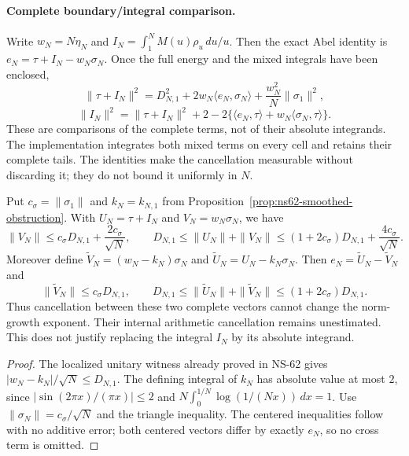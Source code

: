 \paragraph{Complete boundary/integral comparison.}
Write $w_N=N\eta_N$ and
$I_N=\int_1^N M(u)\rho_u\,du/u$.
Then the exact Abel identity is $e_N=\tau+I_N-w_N\sigma_N$.
Once the full energy and the mixed integrals have been enclosed,
\[
 \|\tau+I_N\|^2=D_{N,1}^2+2w_N\langle e_N,\sigma_N\rangle
                          +\frac{w_N^2}{N}\|\sigma_1\|^2,
\]
\[
 \|I_N\|^2=\|\tau+I_N\|^2+2
       -2\{\langle e_N,\tau\rangle+w_N\langle\sigma_N,\tau\rangle\}.
\]
These are comparisons of the complete terms, not of their absolute
integrands. The implementation integrates both mixed terms on every
cell and retains their complete tails. The identities make the
cancellation measurable without discarding it; they do not bound it
uniformly in $N$.

\begin{proposition}
\label{prop:ns67-abel-conditioning}
Put $c_\sigma=\|\sigma_1\|$ and $k_N=k_{N,1}$ from
Proposition~\ref{prop:ns62-smoothed-obstruction}. With
$U_N=\tau+I_N$ and $V_N=w_N\sigma_N$, we have
\begin{equation}
 \|V_N\|\leq c_\sigma D_{N,1}+\frac{2c_\sigma}{\sqrt N},\qquad
 D_{N,1}\leq\|U_N\|+\|V_N\|
 \leq(1+2c_\sigma)D_{N,1}+\frac{4c_\sigma}{\sqrt N}.
 \label{eq:ns67-conditioning}
\end{equation}
Moreover define $\widetilde V_N=(w_N-k_N)\sigma_N$ and
$\widetilde U_N=U_N-k_N\sigma_N$. Then
$e_N=\widetilde U_N-\widetilde V_N$ and
\begin{equation}
 \|\widetilde V_N\|\leq c_\sigma D_{N,1},\qquad
 D_{N,1}\leq\|\widetilde U_N\|+\|\widetilde V_N\|
                \leq(1+2c_\sigma)D_{N,1}.
 \label{eq:ns67-centered-conditioning}
\end{equation}
Thus cancellation between these two complete vectors cannot change the
norm-growth exponent. Their internal arithmetic cancellation remains
unestimated. This does not justify replacing the integral $I_N$ by
its absolute integrand.
\end{proposition}
\begin{proof}
The localized unitary witness already proved in NS-62 gives
$|w_N-k_N|/\sqrt N\leq D_{N,1}$.
The defining integral of $k_N$ has absolute value at most $2$, since
$|\sin(2\pi x)/(\pi x)|\leq2$ and
$N\int_0^{1/N}\log(1/(Nx))\,dx=1$.
Use $\|\sigma_N\|=c_\sigma/\sqrt N$ and the triangle inequality.
The centered inequalities follow with no additive error; both centered
vectors differ by exactly $e_N$, so no cross term is omitted.
\end{proof}

